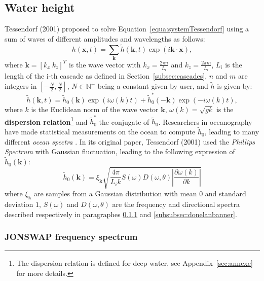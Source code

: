 \documentclass[final]{jcgt}
\begin{document}
\subsection{Water height}
\label{subsec:waterHeight}
Tessendorf (2001) \cite{tessendorfSimulating2001} proposed to solve Equation~\ref{equa:systemTessendorf} using a sum of waves of different amplitudes and wavelengths as follows:
\begin{equation}
	\label{equa:heightWater}
	h(\mathbf x,t)=\sum_{\mathbf{k}} \tilde{h}(\mathbf{k}, t) \exp\left( i \mathbf{k}\cdot \mathbf x\right),
\end{equation}
where $\mathbf{k}=\left[k_x\ k_z\right]^T$ is the wave vector with $k_x=\frac{2\pi n}{L_{i}}$ and $k_z=\frac{2\pi m}{L_{i}}$, $L_i$ is the length of the i-th cascade as defined in Section~\ref{subsec:cascades}, $n$ and $m$ are integers in $\left[-\frac{N}{2},\frac{N}{2}\right]$, $N\in\mathbb N^+$ being a constant given by user, and $\tilde{h}$ is given by:
\begin{equation}
	\label{equa:heightWaterBis}
	\tilde{h}(\mathbf{k}, t) = \tilde{h}_0(\mathbf{k})\exp(i\omega(k)t)+\tilde{h}_0^*(-\mathbf{k})\exp(-i\omega(k)t),
\end{equation}
where $k$ is the Euclidean norm of the wave vector $\mathbf{k}$, $\omega(k)=\sqrt{gk}$ is the \textbf{dispersion relation}\footnote{The dispersion relation is defined for deep water, see Appendix~\ref{sec:annexe} for more details.} and $\tilde{h}_0^*$ the conjugate of $\tilde{h}_0$.
Researchers in oceanography have made statistical measurements on the ocean to compute $\tilde{h}_0$, leading to many different \textit{ocean spectra} \cite{tessendorfGilliganPrototypeFramework2017}.
In its original paper, Tessendorf (2001) \cite{tessendorfSimulating2001} used the \textit{Phillips Spectrum} with Gaussian fluctuation, leading to the following expression of $\tilde{h}_0(\mathbf{k})$:
\begin{equation}
	\tilde{h}_0(\mathbf{k}) = \xi_{\mathbf{k}}\sqrt{\frac{4\pi}{L_ik}S(\omega)D(\omega, \theta)\left|\frac{\partial\omega(k)}{\partial k}\right|}
\end{equation}
where $\xi_{\mathbf{k}}$ are samples from a Gaussian distribution with mean $0$ and standard deviation $1$, $S(\omega)$ and $D(\omega, \theta)$ are the frequency and directional spectra described respectively in paragraphes \ref{subsubsec:jonswap} and \ref{subsubsec:donelanbanner}.

\subsubsection{JONSWAP frequency spectrum}
\label{subsubsec:jonswap}
\end{document}
